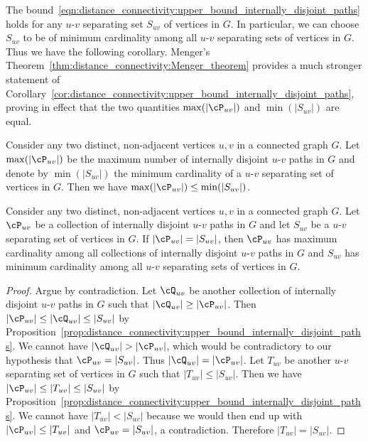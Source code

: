 The
bound~\eqref{eqn:distance_connectivity:upper_bound_internally_disjoint_paths}
holds for any $u$-$v$ separating set $S_{uv}$ of vertices in $G$. In
particular, we can choose $S_{uv}$ to be of minimum cardinality among
all $u$-$v$ separating sets of vertices in $G$. Thus we have the
following corollary. Menger's
Theorem~\ref{thm:distance_connectivity:Menger_theorem} provides a much
stronger statement of
Corollary~\ref{cor:distance_connectivity:upper_bound_internally_disjoint_paths},
proving in effect that the two quantities $\max(|\cP_{uv}|)$ and
$\min(|S_{uv}|)$ are equal.

\begin{corollary}
\label{cor:distance_connectivity:upper_bound_internally_disjoint_paths}
Consider any two distinct, non-adjacent vertices $u,v$ in a connected
graph $G$. Let $\max(|\cP_{uv}|)$ be the maximum number of internally
disjoint $u$-$v$ paths in $G$ and denote by $\min(|S_{uv}|)$ the
minimum cardinality of a $u$-$v$ separating set of vertices in
$G$. Then we have $\max(|\cP_{uv}|) \leq \min(|S_{uv}|)$.
\end{corollary}

\begin{corollary}
Consider any two distinct, non-adjacent vertices $u,v$ in a connected
graph $G$. Let $\cP_{uv}$ be a collection of internally disjoint
$u$-$v$ paths in $G$ and let $S_{uv}$ be a $u$-$v$ separating set of
vertices in $G$. If $|\cP_{uv}| = |S_{uv}|$, then $\cP_{uv}$ has
maximum cardinality among all collections of internally disjoint
$u$-$v$ paths in $G$ and $S_{uv}$ has minimum cardinality among all
$u$-$v$ separating sets of vertices in $G$.
\end{corollary}

\begin{proof}
Argue by contradiction. Let $\cQ_{uv}$ be another collection of
internally disjoint $u$-$v$ paths in $G$ such that
$|\cQ_{uv}| \geq |\cP_{uv}|$. Then
$|\cP_{uv}| \leq |\cQ_{uv}| \leq |S_{uv}|$ by
Proposition~\ref{prop:distance_connectivity:upper_bound_internally_disjoint_paths}.
We cannot have $|\cQ_{uv}| > |\cP_{uv}|$, which would be contradictory
to our hypothesis that $\cP_{uv} = |S_{uv}|$. Thus
$|\cQ_{uv}| = |\cP_{uv}|$. Let $T_{uv}$ be another $u$-$v$
separating set of vertices in $G$ such that
$|T_{uv}| \leq |S_{uv}|$. Then we have
$|\cP_{uv}| \leq |T_{uv}| \leq |S_{uv}|$ by
Proposition~\ref{prop:distance_connectivity:upper_bound_internally_disjoint_paths}.
We cannot have $|T_{uv}| < |S_{uv}|$ because we would then end up with
$|\cP_{uv}| \leq |T_{uv}|$ and $\cP_{uv} = |S_{uv}|$, a
contradiction. Therefore $|T_{uv}| = |S_{uv}|$.
\end{proof}

